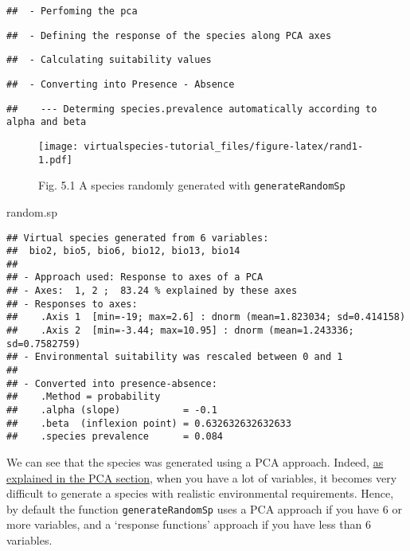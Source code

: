 \documentclass[]{article}
\newenvironment{Shaded}{\begin{snugshade}}{\end{snugshade}}
\newcommand{\NormalTok}[1]{#1}
\begin{document}
\begin{verbatim}
##  - Perfoming the pca
\end{verbatim}

\begin{verbatim}
##  - Defining the response of the species along PCA axes
\end{verbatim}

\begin{verbatim}
##  - Calculating suitability values
\end{verbatim}

\begin{verbatim}
##  - Converting into Presence - Absence
\end{verbatim}

\begin{verbatim}
##    --- Determing species.prevalence automatically according to alpha and beta
\end{verbatim}

\begin{figure}
\centering
\texttt{[image: virtualspecies-tutorial\_files/figure-latex/rand1-1.pdf]}
\caption{Fig. 5.1 A species randomly generated with
\texttt{generateRandomSp}}
\end{figure}

\begin{Shaded}
\begin{Highlighting}[]
\NormalTok{random.sp}
\end{Highlighting}
\end{Shaded}

\begin{verbatim}
## Virtual species generated from 6 variables:
##  bio2, bio5, bio6, bio12, bio13, bio14
## 
## - Approach used: Response to axes of a PCA
## - Axes:  1, 2 ;  83.24 % explained by these axes
## - Responses to axes:
##    .Axis 1  [min=-19; max=2.6] : dnorm (mean=1.823034; sd=0.414158)
##    .Axis 2  [min=-3.44; max=10.95] : dnorm (mean=1.243336; sd=0.7582759)
## - Environmental suitability was rescaled between 0 and 1
## 
## - Converted into presence-absence:
##    .Method = probability
##    .alpha (slope)           = -0.1
##    .beta  (inflexion point) = 0.632632632632633
##    .species prevalence      = 0.084
\end{verbatim}

We can see that the species was generated using a PCA approach. Indeed,
\protect\hyperlink{second-approach-generate-virtual-species-with-a-principal-components-analysis}{as
explained in the PCA section}, when you have a lot of variables, it
becomes very difficult to generate a species with realistic
environmental requirements. Hence, by default the function
\texttt{generateRandomSp} uses a PCA approach if you have 6 or more
variables, and a `response functions' approach if you have less than 6
variables.
\end{document}
